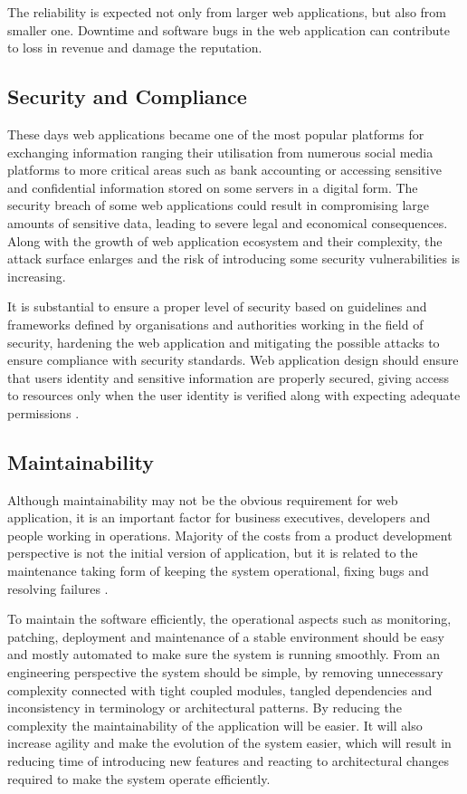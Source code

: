 The reliability is expected not only from larger web applications, but also from smaller one. Downtime and software bugs in the web application can contribute to loss in revenue and damage the reputation.

\subsection*{Security and Compliance}

These days web applications became one of the most popular platforms for exchanging information ranging their utilisation from numerous social media platforms to more critical areas such as bank accounting or accessing sensitive and confidential information stored on some servers in a digital form. The security breach of some web applications could result in compromising large amounts of sensitive data, leading to severe legal and economical consequences. Along with the growth of web application ecosystem and their complexity, the attack surface enlarges and the risk of introducing some security vulnerabilities is increasing.

It is substantial to ensure a proper level of security based on guidelines and frameworks defined by organisations and authorities working in the field of security, hardening the web application and mitigating the possible attacks to ensure compliance with security standards. Web application design should ensure that users identity and sensitive information are properly secured, giving access to resources only when the user identity is verified along with expecting adequate permissions \cite{ASurveyonWebApplicationSecurity}.

\subsection*{Maintainability}

Although maintainability may not be the obvious requirement for web application, it is an important factor for business executives, developers and people working in operations. Majority of the costs from a product development perspective is not the initial version of application, but it is related to the maintenance taking form of keeping the system operational, fixing bugs and resolving failures \cite{DesignDataIntensiveApplications}.

To maintain the software efficiently, the operational aspects such as monitoring, patching, deployment and maintenance of a stable environment should be easy and mostly automated to make sure the system is running smoothly. From an engineering perspective the system should be simple, by removing unnecessary complexity connected with tight coupled modules, tangled dependencies and inconsistency in terminology or architectural patterns. By reducing the complexity the maintainability of the application will be easier. It will also increase agility and make the evolution of the system easier, which will result in reducing time of introducing new features and reacting to architectural changes required to make the system operate efficiently.

